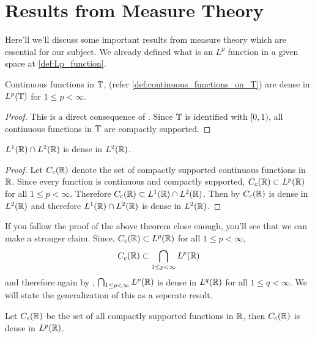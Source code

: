 
\chapter{Results from Measure Theory}
Here'll we'll discuss some important results from measure theory which are essential for our subject. We already defined what is an $L^p$ function in a given space at \autoref{def:Lp_function}.

\begin{proposition}
  \label{prop:continuous_functions_in_T_are_dense_in_L1}
  Continuous functions in $\mathbb T$, (refer \autoref{def:continuous_functions_on_T}) are dense in $L^p(\mathbb T)$ for $1\le p < \infty$.
\end{proposition}
\begin{proof}
  This is a direct consequence of \autocite[Theorem~3.14 on \pno~69]{papaRudin}. Since $\mathbb T$ is identified with $[0, 1)$, all continuous functions in $\mathbb T$ are compactly supported.
\end{proof}

\begin{proposition}
  \label{thm:L1_functions_are_dense_in_L2}
  $L^1(\mathbb R) \cap L^2(\mathbb R)$ is dense in $L^2(\mathbb R)$.
\end{proposition}
\begin{proof}
  Let $C_c(\mathbb R)$ denote the set of compactly supported continuous functions in $\mathbb R$. Since every function is continuous and compactly supported, $C_c(\mathbb R) \subset L^p(\mathbb R)$ for all $1\le p < \infty$. Therefore $C_c(\mathbb R) \subset L^1(\mathbb R) \cap L^2(\mathbb R)$. Then by \autocite[Theorem~3.14 on \pno~69]{papaRudin} $C_c(\mathbb R)$ is dense in $L^2(\mathbb R)$ and therefore $L^1(\mathbb R) \cap L^2(\mathbb R)$ is dense in $L^2(\mathbb R)$.
\end{proof}

If you follow the proof of the above theorem close enough, you'll see that we can make a stronger claim. Since, $C_c(\mathbb R) \subset L^p(\mathbb R)$ for all $1\le p < \infty$, $$C_c(\mathbb R) \subset \bigcap_{1\le p < \infty} L^p(\mathbb R)$$
and therefore again by \autocite[Theorem~3.14 on \pno~69]{papaRudin}, $\bigcap_{1\le p < \infty} L^p(\mathbb R)$ is dense in $L^q(\mathbb R)$ for all $1 \le q < \infty$. We will state the generalization of this as a seperate result.

\begin{proposition}
\label{prop:compact_supported_cont_func_are_dense_in_Lp}
  Let $C_c(\mathbb R)$ be the set of all compactly supported functions in $\mathbb R$, then $C_c(\mathbb R)$ is dense in $L^p(\mathbb R)$.
\end{proposition}

